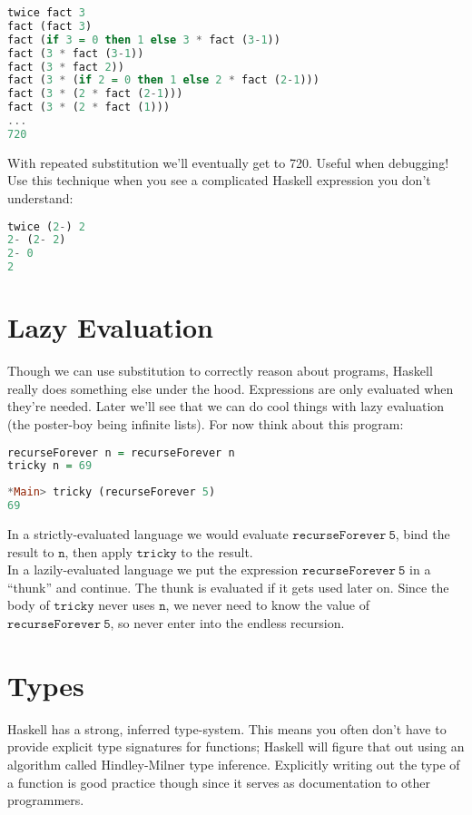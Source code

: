 \documentclass[a4paper,12pt]{article}
\newcommand{\keywadj}[1]{\mathtt{#1}}
\begin{document}
\begin{lstlisting}[language=Haskell]
twice fact 3
fact (fact 3)
fact (if 3 = 0 then 1 else 3 * fact (3-1))
fact (3 * fact (3-1))
fact (3 * fact 2))
fact (3 * (if 2 = 0 then 1 else 2 * fact (2-1)))
fact (3 * (2 * fact (2-1)))
fact (3 * (2 * fact (1)))
...
720
\end{lstlisting}

\noindent
With repeated substitution we'll eventually get to 720. Useful when debugging! Use this technique when you see a complicated Haskell expression you don't understand:

\begin{lstlisting}[language=Haskell]
twice (2-) 2
2- (2- 2)
2- 0
2
\end{lstlisting}

\section{Lazy Evaluation}
Though we can use substitution to correctly reason about programs, Haskell really does something else under the hood. Expressions are only evaluated when they're needed. Later we'll see that we can do cool things with lazy evaluation (the poster-boy being infinite lists). For now think about this program:

\begin{lstlisting}[language=Haskell]
recurseForever n = recurseForever n
tricky n = 69
\end{lstlisting}

\begin{lstlisting}[language=Haskell]
*Main> tricky (recurseForever 5)
69
\end{lstlisting}

\noindent
In a strictly-evaluated language we would evaluate $\keywadj{recurseForever~5}$, bind the result to $\keywadj{n}$, then apply $\keywadj{tricky}$ to the result. \\

\noindent
In a lazily-evaluated language we put the expression $\keywadj{recurseForever~5}$ in a ``thunk'' and continue. The thunk is evaluated if it gets used later on. Since the body of $\keywadj{tricky}$ never uses $\keywadj{n}$, we never need to know the value of $\keywadj{recurseForever~5}$, so never enter into the endless recursion.

\section{Types}
Haskell has a strong, inferred type-system. This means you often don't have to provide explicit type signatures for functions; Haskell will figure that out using an algorithm called Hindley-Milner type inference. Explicitly writing out the type of a function is good practice though since it serves as documentation to other programmers. \\
\end{document}
